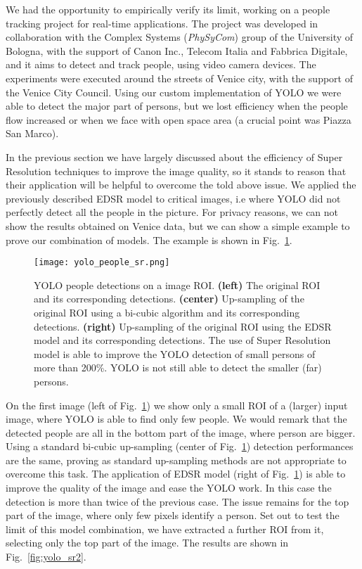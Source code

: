 \documentclass{standalone}
\begin{document}
We had the opportunity to empirically verify its limit, working on a people tracking project for real-time applications.
The project was developed in collaboration with the Complex Systems (\emph{PhySyCom}) group of the University of Bologna, with the support of Canon Inc., Telecom Italia and Fabbrica Digitale, and it aims to detect and track people, using video camera devices.
The experiments were executed around the streets of Venice city, with the support of the Venice City Council.
Using our custom implementation of YOLO we were able to detect the major part of persons, but we lost efficiency when the people flow increased or when we face with open space area (a crucial point was Piazza San Marco).

In the previous section we have largely discussed about the efficiency of Super Resolution techniques to improve the image quality, so it stands to reason that their application will be helpful to overcome the told above issue.
We applied the previously described EDSR model to critical images, i.e where YOLO did not perfectly detect all the people in the picture.
For privacy reasons, we can not show the results obtained on Venice data, but we can show a simple example to prove our combination of models.
The example is shown in Fig.~\ref{fig:yolo_sr}.

\begin{figure}[htbp]
\centering
\texttt{[image: yolo\_people\_sr.png]}
\caption{YOLO people detections on a image ROI.
\textbf{(left)} The original ROI and its corresponding detections.
\textbf{(center)} Up-sampling of the original ROI using a bi-cubic algorithm and its corresponding detections.
\textbf{(right)} Up-sampling of the original ROI using the EDSR model and its corresponding detections.
The use of Super Resolution model is able to improve the YOLO detection of small persons of more than 200\%.
YOLO is not still able to detect the smaller (far) persons.
}
\label{fig:yolo_sr}
\end{figure}

On the first image (left of Fig.~\ref{fig:yolo_sr}) we show only a small ROI of a (larger) input image, where YOLO is able to find only few people.
We would remark that the detected people are all in the bottom part of the image, where person  are bigger.
Using a standard bi-cubic up-sampling (center of Fig.~\ref{fig:yolo_sr}) detection performances are the same, proving as standard up-sampling methods are not appropriate to overcome this task.
The application of EDSR model (right of Fig.~\ref{fig:yolo_sr}) is able to improve the quality of the image and ease the YOLO work.
In this case the detection is more than twice of the previous case.
The issue remains for the top part of the image, where only few pixels identify a person.
Set out to test the limit of this model combination, we have extracted a further ROI from it, selecting only the top part of the image.
The results are shown in Fig.~\ref{fig:yolo_sr2}.
\end{document}
